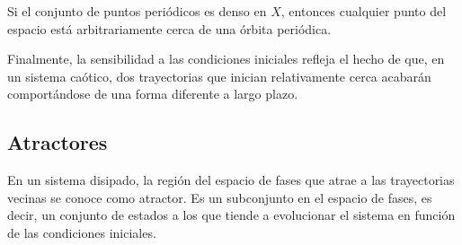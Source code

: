 Si el conjunto de puntos periódicos es denso en $X$, entonces cualquier punto del espacio está arbitrariamente cerca de una órbita periódica. 

Finalmente, la sensibilidad a las condiciones iniciales refleja el hecho de que, en un sistema caótico, dos trayectorias que inician relativamente cerca acabarán comportándose de una forma diferente a largo plazo. 

\subsection{Atractores}

En un sistema disipado, la región del espacio de fases que atrae a las trayectorias vecinas se conoce como atractor. Es un subconjunto en el espacio de fases, es decir, un conjunto de estados a los que tiende a evolucionar el sistema en función de las condiciones iniciales.

